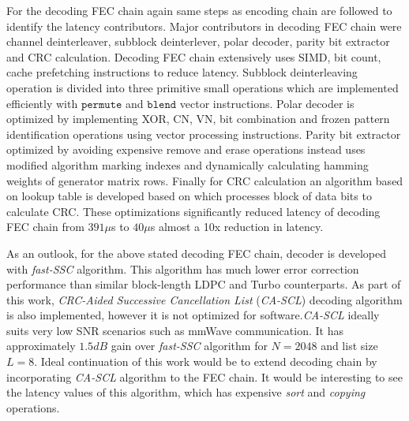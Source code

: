 For the decoding FEC chain again same steps as encoding chain are followed to identify the latency contributors. Major contributors in decoding FEC chain were channel deinterleaver, subblock deinterlever, polar decoder, parity bit extractor and CRC calculation. Decoding FEC chain extensively uses SIMD, bit count, cache prefetching instructions to reduce latency. Subblock deinterleaving operation is divided into  three primitive small operations which are implemented efficiently with $\mathtt{permute}$ and $\mathtt{blend}$ vector instructions. Polar decoder is optimized by implementing XOR, CN, VN, bit combination and frozen pattern identification operations using vector processing instructions. Parity bit extractor optimized by avoiding expensive remove and erase operations instead uses modified algorithm marking indexes and dynamically calculating hamming weights of generator matrix rows. Finally for CRC calculation an algorithm based on lookup table is developed based on \cite{Sarwate:1988:CCR:63030.63037} which processes block of data bits to calculate CRC. These optimizations significantly reduced latency of decoding FEC chain from $391 \mu$s to $40\mu$s almost a 10x reduction in latency. \newline

As an outlook, for the above stated decoding FEC chain, decoder is developed with \emph{fast-SSC} algorithm. This algorithm has much lower error correction performance than similar block-length LDPC and Turbo counterparts. As part of this work, \emph{CRC-Aided Successive Cancellation List} (\emph{CA-SCL})\cite{SCL} decoding algorithm is also implemented, however it is not optimized for software.\emph{CA-SCL} ideally suits very low SNR scenarios such as mmWave communication. It has approximately $1.5dB$ gain over \emph{fast-SSC} algorithm for $N=2048$ and list size $L = 8$. Ideal continuation of this work would be to extend decoding chain by incorporating \emph{CA-SCL} algorithm to the FEC chain. It would be interesting to see the latency values of this algorithm, which has expensive \emph{sort} and \emph{copying} operations.